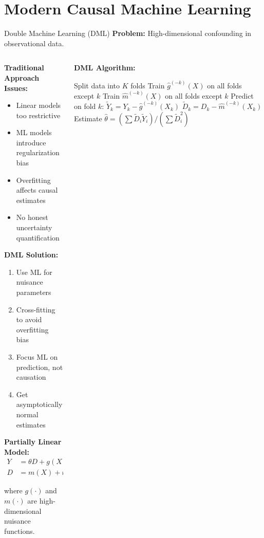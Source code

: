 \documentclass[aspectratio=169,11pt]{beamer}
\begin{document}
\section{Modern Causal Machine Learning}

\begin{frame}{Double Machine Learning (DML)}
\textbf{Problem:} High-dimensional confounding in observational data.

\begin{columns}
\begin{column}{0.5\textwidth}
\textbf{Traditional Approach Issues:}
\begin{itemize}
\item Linear models too restrictive
\item ML models introduce regularization bias
\item Overfitting affects causal estimates
\item No honest uncertainty quantification
\end{itemize}

\vspace{0.3cm}
\textbf{DML Solution:}
\begin{enumerate}
\item Use ML for nuisance parameters
\item Cross-fitting to avoid overfitting bias
\item Focus ML on prediction, not causation
\item Get asymptotically normal estimates
\end{enumerate}

\vspace{0.3cm}
\textbf{Partially Linear Model:}
\begin{align}
Y &= \theta D + g(X) + \epsilon\\
D &= m(X) + \eta
\end{align}

where $g(\cdot)$ and $m(\cdot)$ are high-dimensional nuisance functions.
\end{column}
\begin{column}{0.5\textwidth}
\textbf{DML Algorithm:}

\begin{algorithm}[H]
\caption{Double Machine Learning}
\begin{algorithmic}[1]
\STATE Split data into $K$ folds
\STATE Train $\hat{g}^{(-k)}(X)$ on all folds except $k$
\STATE Train $\hat{m}^{(-k)}(X)$ on all folds except $k$
\STATE Predict on fold $k$:
\STATE \quad $\tilde{Y}_k = Y_k - \hat{g}^{(-k)}(X_k)$
\STATE \quad $\tilde{D}_k = D_k - \hat{m}^{(-k)}(X_k)$
\ENDFOR
\STATE Estimate $\hat{\theta} = (\sum \tilde{D}_i \tilde{Y}_i) / (\sum \tilde{D}_i^2)$
\end{algorithmic}
\end{algorithm}


\end{column}
\end{columns}
\end{frame}
\end{document}
